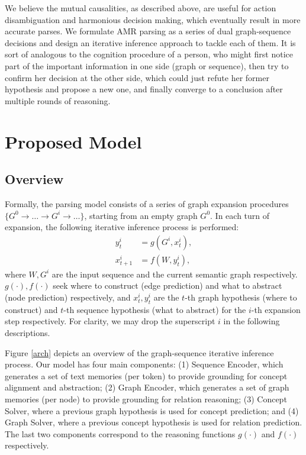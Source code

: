 \documentclass[11pt,a4paper]{article}
\begin{document}
	We believe the mutual causalities, as described above, are useful for action disambiguation and harmonious decision making, which eventually result in more accurate parses. We formulate AMR parsing as a series of dual graph-sequence decisions and design an iterative inference approach to tackle each of them. It is sort of analogous to the cognition procedure of a person, who might first notice part of the important information in one side (graph or sequence), then try to confirm her decision at the other side, which could just refute her former hypothesis and propose a new one, and finally converge to a conclusion after multiple rounds of reasoning.
	\section{Proposed Model}
	\subsection{Overview}
	Formally, the parsing model consists of a series of graph expansion procedures $\{G^0\rightarrow \ldots \rightarrow G^i \rightarrow\ldots\}$, starting from an empty graph $G^0$. In each turn of expansion, the following iterative inference process is performed:
	\begin{align*}
	y^{i}_{t} &= g(G^{i}, x^{i}_{t}), \\
	x^{i}_{t+1} &= f(W, y^{i}_t),
	\end{align*}
	where $W, G^{i}$ are the input sequence and the current semantic graph respectively. $g(\cdot), f(\cdot)$ seek where to construct (edge prediction) and what to abstract (node prediction) respectively, and $x^{i}_t, y^{i}_t$ are the $t$-th graph hypothesis (where to construct) and $t$-th sequence hypothesis (what to abstract) for the $i$-th expansion step respectively. For clarity, we may drop the superscript $i$ in the following descriptions.
	
	Figure \ref{arch} depicts an overview of the graph-sequence iterative inference process. Our model has four main components:  (1) Sequence Encoder, which generates a set of text memories (per token) to provide grounding for concept alignment and abstraction; (2) Graph Encoder, which generates a set of graph memories (per node) to provide grounding for relation reasoning; (3) Concept Solver, where a previous graph hypothesis is used for concept prediction; and (4) Graph Solver, where a previous concept hypothesis is used for relation prediction. The last two components correspond to the reasoning functions $g(\cdot)$ and $f(\cdot)$ respectively.
	
\end{document}
